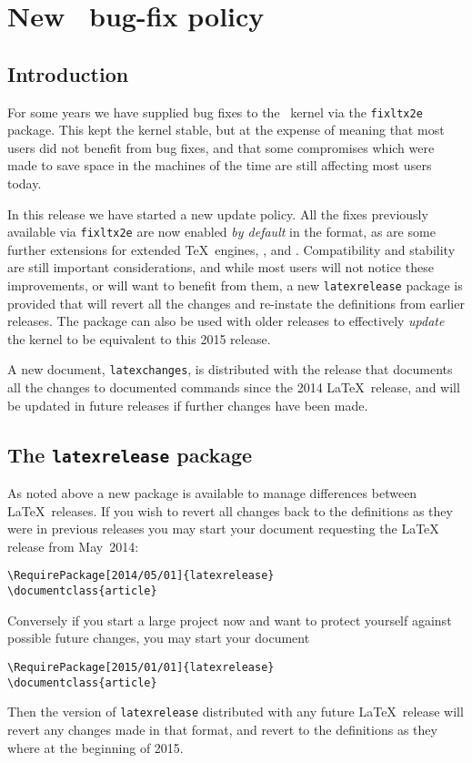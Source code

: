 \documentclass{ltnews}
\providecommand\pkg[1]{\texttt{#1}}
\providecommand\file[1]{\texttt{#1}}
\begin{document}
\maketitle

\section{New \LaTeXe\ bug-fix policy}

\subsection{Introduction}

For some years we have supplied bug fixes to the \LaTeXe\ kernel via the
\pkg{fixltx2e} package. This
kept the kernel stable, but at the expense of meaning that most users did not
benefit from bug fixes, and that some compromises
which were made to save space in the
machines of the time are still affecting most users today.

In this release we have started a new update policy. All the fixes previously
available via \pkg{fixltx2e} are now enabled \emph{by default} in the
format, as are some further extensions for extended \TeX\ engines, \eTeX,
 and . Compatibility and stability are still
important considerations, and while most users will not notice these
improvements, or will want to benefit from them, a new \pkg{latexrelease}
package is provided that will revert all the changes and re-instate the
definitions from earlier releases. The package can also be used with older
releases to effectively \emph{update} the kernel to be equivalent to this 2015
release.

A new document, \file{latexchanges}, is distributed with the release
that documents all the changes to documented commands since the 2014
\LaTeX\ release, and will be updated in future releases if further
changes have been made.

\subsection{The \pkg{latexrelease} package}

As noted above a new package is available to manage differences between \LaTeX\
releases. If you wish to revert all changes back to the definitions as they
were in previous releases you may start your document requesting the \LaTeX{} release from May~2014:
\begin{verbatim}
\RequirePackage[2014/05/01]{latexrelease}
\documentclass{article}
\end{verbatim}
Conversely if you start a large project now and want to protect yourself
against possible future changes, you may start your document
\begin{verbatim}
\RequirePackage[2015/01/01]{latexrelease}
\documentclass{article}
\end{verbatim}
Then the version of \pkg{latexrelease} distributed with any future \LaTeX\
release will revert any changes made in that format, and revert to the
definitions as they where at the beginning of 2015.
\end{document}
